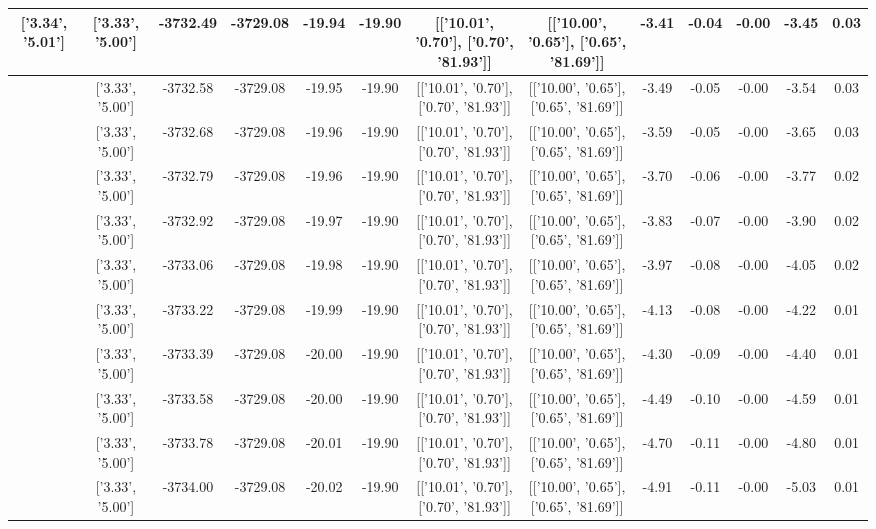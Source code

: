 \begin{table}[htbp]
\begin{adjustbox}{angle=90}
\begin{tabular}{|c|c|c|c|c|c|c|c|c|c|c|c|c|}
 ['3.34', '5.01'] & ['3.33', '5.00'] & -3732.49 & -3729.08 & -19.94 & -19.90 & [['10.01', '0.70'], ['0.70', '81.93']] & [['10.00', '0.65'], ['0.65', '81.69']] & -3.41 & -0.04 & -0.00 & -3.45 & 0.03\\ \hline
 ['3.34', '5.01'] & ['3.33', '5.00'] & -3732.58 & -3729.08 & -19.95 & -19.90 & [['10.01', '0.70'], ['0.70', '81.93']] & [['10.00', '0.65'], ['0.65', '81.69']] & -3.49 & -0.05 & -0.00 & -3.54 & 0.03\\ \hline
 ['3.34', '5.01'] & ['3.33', '5.00'] & -3732.68 & -3729.08 & -19.96 & -19.90 & [['10.01', '0.70'], ['0.70', '81.93']] & [['10.00', '0.65'], ['0.65', '81.69']] & -3.59 & -0.05 & -0.00 & -3.65 & 0.03\\ \hline
 ['3.34', '5.01'] & ['3.33', '5.00'] & -3732.79 & -3729.08 & -19.96 & -19.90 & [['10.01', '0.70'], ['0.70', '81.93']] & [['10.00', '0.65'], ['0.65', '81.69']] & -3.70 & -0.06 & -0.00 & -3.77 & 0.02\\ \hline
 ['3.34', '5.01'] & ['3.33', '5.00'] & -3732.92 & -3729.08 & -19.97 & -19.90 & [['10.01', '0.70'], ['0.70', '81.93']] & [['10.00', '0.65'], ['0.65', '81.69']] & -3.83 & -0.07 & -0.00 & -3.90 & 0.02\\ \hline
 ['3.34', '5.01'] & ['3.33', '5.00'] & -3733.06 & -3729.08 & -19.98 & -19.90 & [['10.01', '0.70'], ['0.70', '81.93']] & [['10.00', '0.65'], ['0.65', '81.69']] & -3.97 & -0.08 & -0.00 & -4.05 & 0.02\\ \hline
 ['3.34', '5.01'] & ['3.33', '5.00'] & -3733.22 & -3729.08 & -19.99 & -19.90 & [['10.01', '0.70'], ['0.70', '81.93']] & [['10.00', '0.65'], ['0.65', '81.69']] & -4.13 & -0.08 & -0.00 & -4.22 & 0.01\\ \hline
 ['3.34', '5.01'] & ['3.33', '5.00'] & -3733.39 & -3729.08 & -20.00 & -19.90 & [['10.01', '0.70'], ['0.70', '81.93']] & [['10.00', '0.65'], ['0.65', '81.69']] & -4.30 & -0.09 & -0.00 & -4.40 & 0.01\\ \hline
 ['3.35', '5.01'] & ['3.33', '5.00'] & -3733.58 & -3729.08 & -20.00 & -19.90 & [['10.01', '0.70'], ['0.70', '81.93']] & [['10.00', '0.65'], ['0.65', '81.69']] & -4.49 & -0.10 & -0.00 & -4.59 & 0.01\\ \hline
 ['3.35', '5.01'] & ['3.33', '5.00'] & -3733.78 & -3729.08 & -20.01 & -19.90 & [['10.01', '0.70'], ['0.70', '81.93']] & [['10.00', '0.65'], ['0.65', '81.69']] & -4.70 & -0.11 & -0.00 & -4.80 & 0.01\\ \hline
 ['3.35', '5.02'] & ['3.33', '5.00'] & -3734.00 & -3729.08 & -20.02 & -19.90 & [['10.01', '0.70'], ['0.70', '81.93']] & [['10.00', '0.65'], ['0.65', '81.69']] & -4.91 & -0.11 & -0.00 & -5.03 & 0.01\\ \hline

\end{tabular}
\end{adjustbox}
\end{table}
